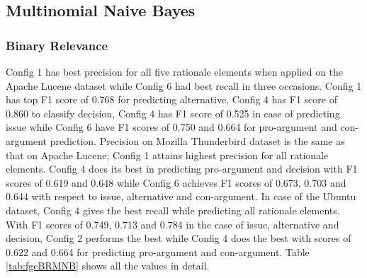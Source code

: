 \documentclass[a4paper,12pt,twoside]{report}
\begin{document}
\subsection{Multinomial Naive Bayes}

\subsubsection{Binary Relevance}
Config 1 has best precision for all five rationale elements when applied on the Apache Lucene dataset while Config 6 had best recall in three occasions. Config 1 has top F1 score of 0.768 for predicting alternative, Config 4 has F1 score of 0.860 to classify decision, Config 4 has F1 score of 0.525 in case of predicting issue while Config 6 have F1 scores of 0.750 and 0.664 for pro-argument and con-argument prediction. Precision on Mozilla Thunderbird dataset is the same as that on Apache Lucene; Config 1 attains highest precision for all rationale elements. Config 4 does its best in predicting pro-argument and decision with F1 scores of 0.619 and 0.648 while Config 6 achieves F1 scores of 0.673, 0.703 and 0.644 with respect to issue, alternative and con-argument. In case of the Ubuntu dataset, Config 4 gives the best recall while predicting all rationale elements. With F1 scores of 0.749, 0.713 and 0.784 in the case of issue, alternative and decision, Config 2 performs the best while Config 4 does the best with scores of 0.622 and 0.664 for predicting pro-argument and con-argument. Table \ref{tab:fgcBRMNB} shows all the values in detail.
\end{document}
